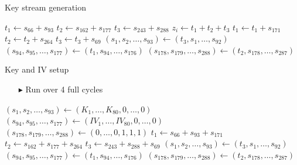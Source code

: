 \documentclass[10pt, compress]{beamer}
\begin{document}
\begin{frame}{Key stream generation}
\begin{center}
\begin{minipage}{\textwidth}
\begin{algorithm}[H]
\begin{algorithmic}[1]
 
\State $t_1 \gets s_{66} + s_{93}$
\State $t_2 \gets s_{162} + s_{177}$
\State $t_3 \gets s_{243} + s_{288}$
\State
\State $z_i \gets t_1 + t_2 + t_3$
\State
\State $t_1 \gets t_1 + s_{171}$
\State $t_2 \gets t_2 + s_{264}$
\State $t_3 \gets t_3 + s_{69}$
\State
\State $(s_1,s_2,\dots,s_{93}) \gets (t_3,s_1,\dots,s_{92})$ 
\State $(s_{94},s_{95},\dots,s_{177}) \gets (t_1,s_{94},\dots,s_{176})$ 
\State $(s_{178},s_{179},\dots,s_{288}) \gets (t_2,s_{178},\dots,s_{287})$ 
\EndFor
\end{algorithmic}
\end{algorithm}
\end{minipage}
\end{center}
\end{frame}

\begin{frame}{Key and IV setup}
\begin{itemize}
\item[$\blacktriangleright$] Run over 4 full cycles
\end{itemize}
\begin{center}
\begin{minipage}{\textwidth}
\begin{algorithm}[H]
\begin{algorithmic}[1]
\State $(s_1,s_2,\dots,s_{93}) \gets (K_1,\dots,K_{80},0,\dots,0)$ 
\State $(s_{94},s_{95},\dots,s_{177}) \gets (IV_1,\dots,IV_{80},0,\dots,0)$ 
\State $(s_{178},s_{179},\dots,s_{288}) \gets (0,\dots,0,1,1,1)$ 
\State
{}
\State $t_1 \gets s_{66} + s_{93} + s_{171}$
\State $t_2 \gets s_{162} + s_{177} + s_{264}$
\State $t_3 \gets s_{243} + s_{288}+ s_{69}$
\State
\State $(s_1,s_2,\dots,s_{93}) \gets (t_3,s_1,\dots,s_{92})$ 
\State $(s_{94},s_{95},\dots,s_{177}) \gets (t_1,s_{94},\dots,s_{176})$ 
\State $(s_{178},s_{179},\dots,s_{288}) \gets (t_2,s_{178},\dots,s_{287})$ 
\EndFor
\end{algorithmic}
\end{algorithm}
\end{minipage}
\end{center}
\end{frame}
\end{document}
